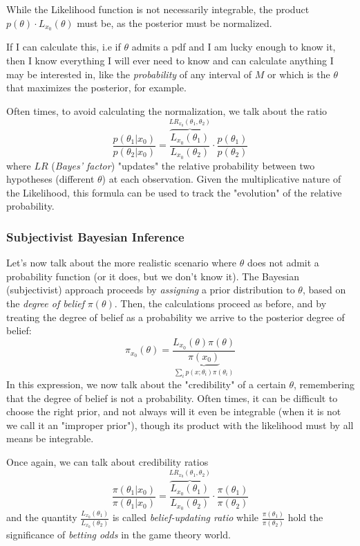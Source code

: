  While the Likelihood function is not necessarily integrable, the product $p(\theta)\cdot L_{x_0}(\theta)$ must be, as the posterior must be normalized. 
 
 
 If I can calculate this, i.e if $\theta$ admits a pdf and I am lucky enough to know it, then I know everything I will ever need to know and can calculate anything I may be interested in, like the \emph{probability} of any interval of $M$ or which is the $\theta$ that maximizes the posterior, for example. 
 
 Often times, to avoid calculating the normalization, we talk about the ratio
 	\[
 	\frac{p(\theta_1|x_0)}{p(\theta_2|x_0)} = \overbrace{\frac{L_{x_0}(\theta_1)}{L_{x_0}(\theta_2)}}^{LR_{x_0}(\theta_1,\theta_2)} \cdot \frac{p(\theta_1)}{p(\theta_2)}
 	\]
 where $LR$ (\emph{Bayes' factor}) "updates" the relative probability between two hypotheses (different $\theta$) at each observation. Given the multiplicative nature of the Likelihood, this formula can be used to track the "evolution" of the relative probability. 
 
\subsubsection{Subjectivist Bayesian Inference}

Let's now talk about the more realistic scenario where $\theta$ does not admit a probability function (or it does, but we don't know it). The Bayesian (subjectivist) approach proceeds by \emph{assigning} a prior distribution to $\theta$, based on the \emph{degree of belief} $\pi(\theta)$. Then, the calculations proceed as before, and by treating the degree of belief as a probability we arrive to the posterior degree of belief:
\begin{equation}
	\pi_{x_0}(\theta) = \frac{L_{x_0}(\theta)\pi(\theta)}{\underbrace{\pi(x_0)}_{\sum_i p(x;\theta_i)\pi(\theta_i)}}
\label{eq:posterior_dob}
\end{equation}
In this expression, we now talk about the "credibility" of a certain $\theta$, remembering that the degree of belief is not a probability. Often times, it can be difficult to choose the right prior, and not always will it even be integrable (when it is not we call it an "improper prior"), though its product with the likelihood must by all means be integrable. 


Once again, we can talk about credibility ratios
 	\[
	\frac{\pi(\theta_1|x_0)}{\pi(\theta_1|x_0)} = \overbrace{\frac{L_{x_0}(\theta_1)}{L_{x_0}(\theta_2)}}^{LR_{x_0}(\theta_1,\theta_2)} \cdot \frac{\pi(\theta_1)}{\pi(\theta_2)}
	\]
 and the quantity $\frac{L_{x_0}(\theta_1)}{L_{x_0}(\theta_2)}$ is called \emph{belief-updating ratio} while $\frac{\pi(\theta_1)}{\pi(\theta_2)}$ hold the significance of \emph{betting odds} in the game theory world.
 
